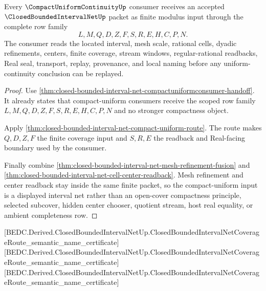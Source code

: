 \begin{theorem}
\label{thm:closed-bounded-interval-net-uniform-modulus-input}
Every $\CompactUniformContinuityUp$ consumer receives an accepted $\ClosedBoundedIntervalNetUp$ packet as finite modulus input through the complete row family
$$
L,M,Q,D,Z,F,S,R,E,H,C,P,N.
$$
The consumer reads the located interval, mesh scale, rational cells, dyadic refinements, centers, finite coverage, stream windows, regular-rational readbacks, Real seal, transport, replay, provenance, and local naming before any uniform-continuity conclusion can be replayed.
\end{theorem}
\begin{proof}
Use \autoref{thm:closed-bounded-interval-net-compactuniformconsumer-handoff}. It already states that compact-uniform consumers receive the scoped row family $L,M,Q,D,Z,F,S,R,E,H,C,P,N$ and no stronger compactness object.

Apply \autoref{thm:closed-bounded-interval-net-compact-uniform-route}. The route makes $Q,D,Z,F$ the finite coverage input and $S,R,E$ the readback and Real-facing boundary used by the consumer.

Finally combine \autoref{thm:closed-bounded-interval-net-mesh-refinement-fusion} and \autoref{thm:closed-bounded-interval-net-cell-center-readback}. Mesh refinement and center readback stay inside the same finite packet, so the compact-uniform input is a displayed interval net rather than an open-cover compactness principle, selected subcover, hidden center chooser, quotient stream, host real equality, or ambient completeness row.
\end{proof}



[BEDC.Derived.ClosedBoundedIntervalNetUp.ClosedBoundedIntervalNetCoverageRoute\_semantic\_name\_certificate]
[BEDC.Derived.ClosedBoundedIntervalNetUp.ClosedBoundedIntervalNetCoverageRoute\_semantic\_name\_certificate]
[BEDC.Derived.ClosedBoundedIntervalNetUp.ClosedBoundedIntervalNetCoverageRoute\_semantic\_name\_certificate]

